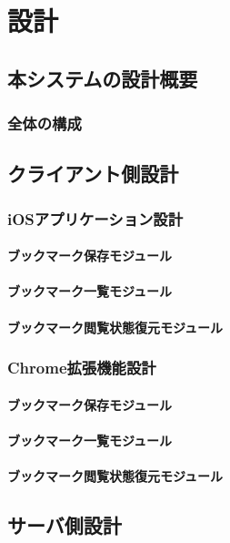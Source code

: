 \chapter{設計}
\label{chap:design}

\section{本システムの設計概要}
\subsection{全体の構成}

\section{クライアント側設計}
\subsection{iOSアプリケーション設計}
\subsubsection{ブックマーク保存モジュール}
\subsubsection{ブックマーク一覧モジュール}
\subsubsection{ブックマーク閲覧状態復元モジュール}

\subsection{Chrome拡張機能設計}
\subsubsection{ブックマーク保存モジュール}
\subsubsection{ブックマーク一覧モジュール}
\subsubsection{ブックマーク閲覧状態復元モジュール}

\section{サーバ側設計}
